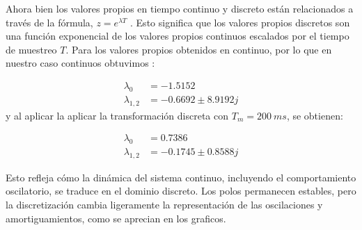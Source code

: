 Ahora bien los valores propios en tiempo continuo y discreto están relacionados 
a través de la fórmula, $z = e^{\lambda T}$ .
Esto significa que los valores propios discretos son una función exponencial de 
los valores propios continuos escalados por el tiempo de muestreo \( T \). Para 
los valores propios obtenidos en continuo, por lo que en nuestro caso continuos 
obtuvimos :

\begin{align}
  \lambda_{0} &= -1.5152 \\
  \lambda_{1,2} &= -0.6692 \pm 8.9192j
\end{align}
y al aplicar la aplicar la transformación discreta con \( T_{m} = 200\ \unit{ms} 
\), se obtienen:

\begin{align}
  \lambda_{0} &= 0.7386 \\
  \lambda_{1,2} &= -0.1745 \pm 0.8588j
\end{align}

Esto refleja cómo la dinámica del sistema continuo, incluyendo el 
comportamiento oscilatorio, se traduce en el dominio discreto. Los polos 
permanecen estables, pero la discretización cambia ligeramente la 
representación de las oscilaciones y amortiguamientos, como se aprecian en los 
graficos.



